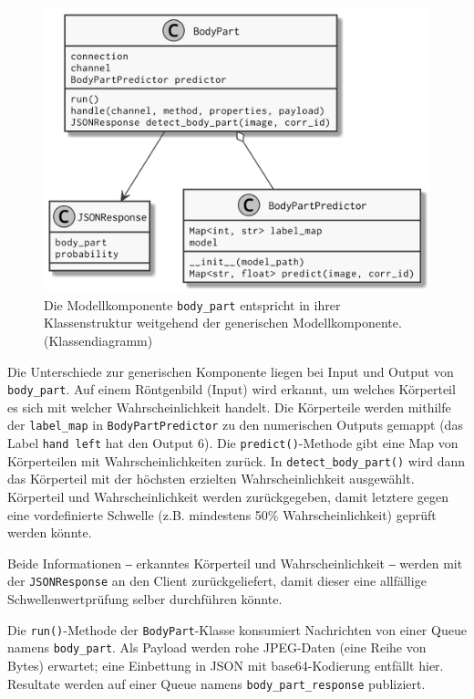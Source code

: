 \begin{figure}[tbh]
    \centering
    \includegraphics[width=0.9\linewidth]{pics/class-body-part.png}
    \caption{Die Modellkomponente \texttt{body\_part} entspricht in ihrer Klassenstruktur weitgehend der generischen Modellkomponente. (Klassendiagramm)}
    \label{fig:klassendiagramm-body-part}
\end{figure}

Die Unterschiede zur generischen Komponente liegen bei Input und Output von \texttt{body\_part}. Auf einem Röntgenbild (Input) wird erkannt, um welches Körperteil es sich mit welcher Wahrscheinlichkeit handelt. Die Körperteile werden mithilfe der \texttt{label\_map} in \texttt{BodyPartPredictor} zu den numerischen Outputs gemappt (das Label \texttt{hand left} hat den Output 6). Die \texttt{predict()}-Methode gibt eine Map von Körperteilen mit Wahrscheinlichkeiten zurück. In \texttt{detect\_body\_part()} wird dann das Körperteil mit der höchsten erzielten Wahrscheinlichkeit ausgewählt. Körperteil und Wahrscheinlichkeit werden zurückgegeben, damit letztere gegen eine vordefinierte Schwelle (z.B. mindestens 50\% Wahrscheinlichkeit) geprüft werden könnte.

Beide Informationen ‒ erkanntes Körperteil und Wahrscheinlichkeit ‒ werden mit der \texttt{JSONResponse} an den Client zurückgeliefert, damit dieser eine allfällige Schwellenwertprüfung selber durchführen könnte.

Die \texttt{run()}-Methode der \texttt{BodyPart}-Klasse konsumiert Nachrichten von einer Queue namens \texttt{body\_part}. Als Payload werden rohe JPEG-Daten (eine Reihe von Bytes) erwartet; eine Einbettung in JSON mit base64-Kodierung entfällt hier. Resultate werden auf einer Queue namens \texttt{body\_part\_response} publiziert.

